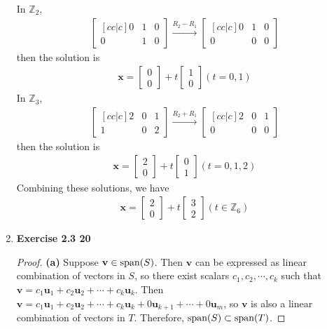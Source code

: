 \begin{enumerate}
	\noindent In $\mathbb{Z}_2$,
	\begin{align*}
		\begin{bmatrix} [cc|c]
			0 & 1 & 0 \\ 0 & 1 & 0
		\end{bmatrix} \xrightarrow{R_2 - R_1} \begin{bmatrix} [cc|c]
			0 & 1 & 0 \\ 0 & 0 & 0
		\end{bmatrix}
	\end{align*} then the solution is
	\begin{align*}
		\textbf{x} = \begin{bmatrix}
			0 \\ 0
		\end{bmatrix} + t\begin{bmatrix}
			1 \\ 0
		\end{bmatrix} (t = 0, 1)
	\end{align*}
	\noindent In $\mathbb{Z}_3$,
	\begin{align*}
		\begin{bmatrix} [cc|c]
		2 & 0 & 1 \\ 1 & 0 & 2
		\end{bmatrix} \xrightarrow{R_2 + R_1} \begin{bmatrix} [cc|c]
		2 & 0 & 1 \\ 0 & 0 & 0
		\end{bmatrix}
	\end{align*} then the solution is
	\begin{align*}
		\textbf{x} = \begin{bmatrix}
			2 \\ 0
		\end{bmatrix} + t\begin{bmatrix}
			0 \\ 1
		\end{bmatrix} (t = 0, 1, 2)
	\end{align*}
	Combining these solutions, we have
	\begin{align*}
		\textbf{x} = \begin{bmatrix}
			2 \\ 0
		\end{bmatrix} + t\begin{bmatrix}
			3 \\ 2
		\end{bmatrix} (t \in \mathbb{Z}_6)
	\end{align*}
	\item \textbf{Exercise 2.3 20}
	\begin{proof}
		\textbf{(a)} Suppose $\textbf{v} \in \textnormal{span}(S)$. Then $\textbf{v}$ can be expressed as linear combination of vectors in $S$, so there exist scalars $c_1, c_2, \cdots, c_k$ such that $\textbf{v} = c_1\textbf{u}_1 + c_2\textbf{u}_2 + \cdots + c_k\textbf{u}_k$. Then $\textbf{v} = c_1\textbf{u}_1 + c_2\textbf{u}_2 + \cdots + c_k\textbf{u}_k + 0\textbf{u}_{k+1} + \cdots + 0\textbf{u}_m$, so $\textbf{v}$ is also a linear combination of vectors in $T$. Therefore, $\textnormal{span}(S) \subset \textnormal{span}(T)$.
		

\end{proof}
\end{enumerate}
